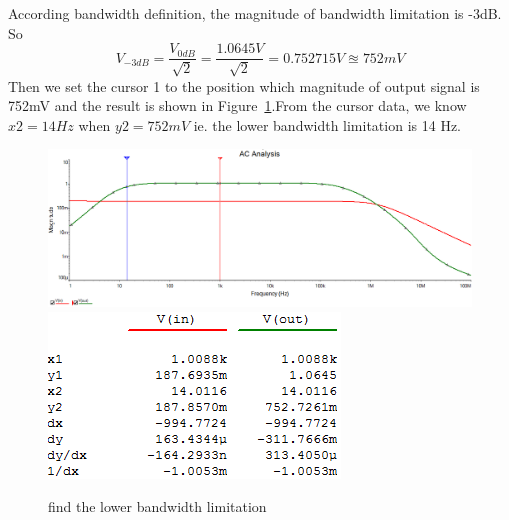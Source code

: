 According bandwidth definition, the magnitude of bandwidth limitation is -3dB.
So
\[ V_{-3dB}=\frac{V_{0dB}}{\sqrt{2}}=\frac{1.0645V}{\sqrt{2}}=0.752715V\approxeq 752 mV\]
Then we set the cursor 1 to the position which magnitude of output signal is 752mV and the result is shown in Figure~\ref{fig:find the lower bandwidth limitation}.From the cursor data, we know $x2=14 Hz$ when $y2 = 752mV$ ie. the lower bandwidth limitation is 14 Hz.
\begin{figure}[htbp]
\centering
\includegraphics[scale=0.45]{"../Photo/Chap7/lower bandwoth"}\\[0.5cm]
\includegraphics[scale=1]{"../Photo/Chap7/lower bandwoth data"}
\caption{find the lower bandwidth limitation}
\label{fig:find the lower bandwidth limitation}
\end{figure}

